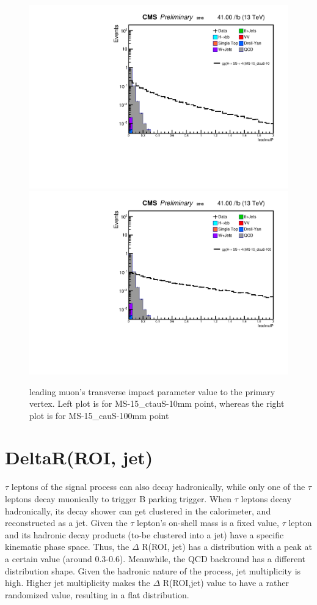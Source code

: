  \begin{figure}[h!]
   \caption{leading muon's transverse impact parameter value to the primary vertex. Left plot is for MS-15\_ctauS-10mm point, whereas the right plot is for MS-15\_cauS-100mm point}
   \label{fig:leadmuIP}
   \centering
   \includegraphics[width=0.47\linewidth]{figs/AnalysisNoteplot_MS-15_ctauS-10_leadmuIP.pdf}
   \includegraphics[width=0.47\linewidth]{figs/AnalysisNoteplot_MS-15_ctauS-100_leadmuIP.pdf}
 \end{figure}


\section{DeltaR(ROI, jet)}\label{ref:jetdR}
$\tau$ leptons of the signal process can also decay hadronically, while only one of the $\tau$ leptons decay muonically to trigger B parking trigger.
When $\tau$ leptons decay hadronically, its decay shower can get clustered in the calorimeter, and reconstructed as a jet.
Given the $\tau$ lepton's on-shell mass is a fixed value, $\tau$ lepton and its hadronic decay products (to-be clustered into a jet) have a specific kinematic phase space.
Thus, the $\Delta$ R(ROI, jet) has a distribution with a peak at a certain value (around 0.3-0.6).
Meanwhile, the QCD backround has a different distribution shape.
Given the hadronic nature of the process, jet multiplicity is high. 
Higher jet multiplicity makes the $\Delta$ R(ROI,jet) value to have a rather randomized value, resulting in a flat distribution. 

